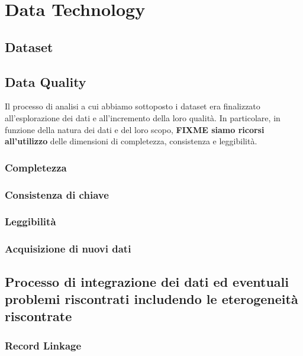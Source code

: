 \setcounter{chapter}{0}

\part{Data Technology}

\chapter{Dataset}

\chapter{Data Quality}
Il processo di analisi a cui abbiamo sottoposto i dataset era finalizzato 
all'esplorazione dei dati e all'incremento della loro qualità. In particolare, 
in funzione della natura dei dati e del loro scopo, \textbf{FIXME siamo ricorsi 
all'utilizzo} delle dimensioni di completezza, consistenza e leggibilità.


\section{Completezza}

\section{Consistenza di chiave}

\section{Leggibilità}

\section{Acquisizione di nuovi dati}

\chapter{Processo di integrazione dei dati ed eventuali problemi riscontrati includendo le eterogeneità riscontrate}

\section{Record Linkage}

